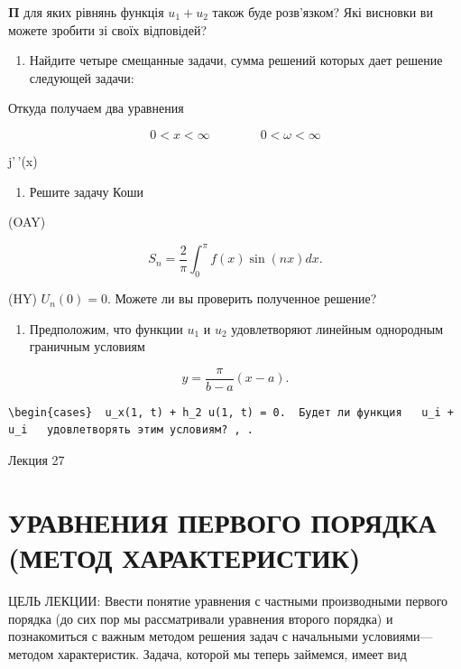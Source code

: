\documentclass[
  ukrainian,
]{article}
\providecommand{\tightlist}{%
  \setlength{\itemsep}{0pt}\setlength{\parskip}{0pt}}
\begin{document}
\(\mathbf{\Pi}\) для яких рівнянь функція \(u_1 + u_2\) також буде
розв'язком? Які висновки ви можете зробити зі своїх відповідей?

\begin{enumerate}
\def\labelenumi{\arabic{enumi}.}
\setcounter{enumi}{3}
\tightlist
\item
  Найдите четыре смещанные задачи, сумма решений которых дает решение
  следующей задачи:
\end{enumerate}

Откуда получаем два уравнения

\[
0 < x < \infty \qquad \qquad 0 < \omega < \infty
\]

j'\,'(x)

\begin{enumerate}
\def\labelenumi{\arabic{enumi}.}
\setcounter{enumi}{4}
\tightlist
\item
  Решите задачу Коши
\end{enumerate}

(OAY)

\[
S_n = \frac{2}{\pi} \int_0^{\pi} f(x) \sin(nx) dx.
\]

(HY) \(U_n(0) = 0.\) Можете ли вы проверить полученное решение?

\begin{enumerate}
\def\labelenumi{\arabic{enumi}.}
\setcounter{enumi}{5}
\tightlist
\item
  Предположим, что функции \(u_1\) и \(u_2\) удовлетворяют линейным
  однородным граничным условиям
\end{enumerate}

\[
y = \frac{\pi}{b - a} (x - a).
\]

\begin{verbatim}
\begin{cases}  u_x(1, t) + h_2 u(1, t) = 0.  Будет ли функция   u_i + u_i   удовлетворять этим условиям? , .
\end{verbatim}

Лекция 27

\section{УРАВНЕНИЯ ПЕРВОГО ПОРЯДКА (МЕТОД
ХАРАКТЕРИСТИК)}\label{ux443ux440ux430ux432ux43dux435ux43dux438ux44f-ux43fux435ux440ux432ux43eux433ux43e-ux43fux43eux440ux44fux434ux43aux430-ux43cux435ux442ux43eux434-ux445ux430ux440ux430ux43aux442ux435ux440ux438ux441ux442ux438ux43a}

ЦЕЛЬ ЛЕКЦИИ: Ввести понятие уравнения с частными производными первого
порядка (до сих пор мы рассматривали уравнения второго порядка) и
познакомиться с важным методом решения задач с начальными
условиями---методом характеристик. Задача, которой мы теперь займемся,
имеет вид
\end{document}
